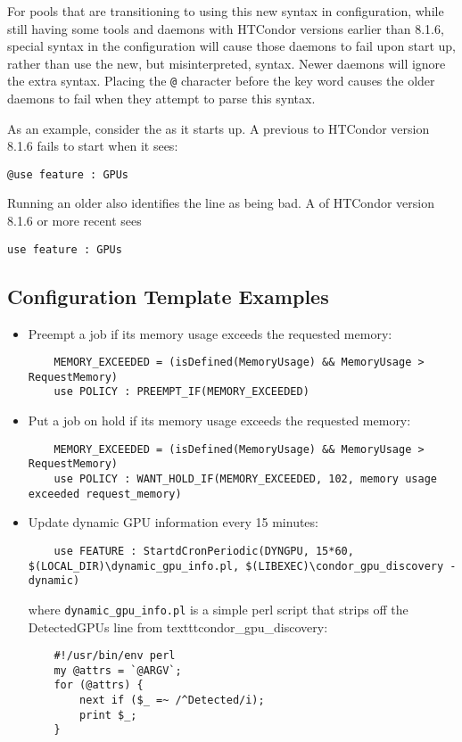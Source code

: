 For pools that are transitioning to using this new syntax in configuration,
while still having some tools and daemons with HTCondor versions 
earlier than 8.1.6,
special syntax in the configuration will cause those daemons to
fail upon start up,
rather than use the new, but misinterpreted, syntax. 
Newer daemons will ignore the extra syntax.
Placing the \verb|@| character before the  key word
causes the older daemons to fail when they attempt to
parse this syntax.

As an example, consider the  as it starts up.
A  previous to HTCondor version 8.1.6 fails to start
when it sees:
\begin{verbatim}
@use feature : GPUs
\end{verbatim}
Running an older  also identifies the 
line as being bad.
A  of HTCondor version 8.1.6 or more recent sees
\begin{verbatim}
use feature : GPUs
\end{verbatim}

\subsection{\label{sec:Config-Template-Examples}Configuration Template
Examples}

\begin{itemize}
\item Preempt a job if its memory usage exceeds the requested memory:
    \begin{verbatim}
	MEMORY_EXCEEDED = (isDefined(MemoryUsage) && MemoryUsage > RequestMemory)
	use POLICY : PREEMPT_IF(MEMORY_EXCEEDED)
    \end{verbatim}

\item Put a job on hold if its memory usage exceeds the requested memory:
    \begin{verbatim}
	MEMORY_EXCEEDED = (isDefined(MemoryUsage) && MemoryUsage > RequestMemory)
	use POLICY : WANT_HOLD_IF(MEMORY_EXCEEDED, 102, memory usage exceeded request_memory)
    \end{verbatim}

\item Update dynamic GPU information every 15 minutes:

    \begin{verbatim}
	use FEATURE : StartdCronPeriodic(DYNGPU, 15*60, $(LOCAL_DIR)\dynamic_gpu_info.pl, $(LIBEXEC)\condor_gpu_discovery -dynamic)
    \end{verbatim}

where \texttt{dynamic\_gpu\_info.pl}  is a simple perl script that strips
off the DetectedGPUs line from texttt{condor\_gpu\_discovery}:

    \begin{verbatim}
	#!/usr/bin/env perl
	my @attrs = `@ARGV`;
	for (@attrs) {
		next if ($_ =~ /^Detected/i);
		print $_;
	}
    \end{verbatim}
\end{itemize}

